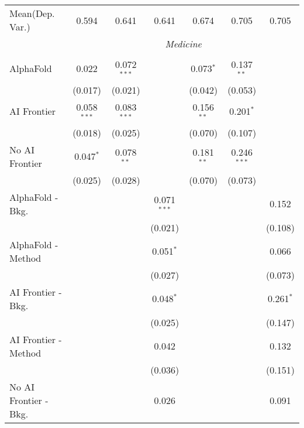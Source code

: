 \begin{tabular}{lcccccc}
Mean(Dep. Var.) & 0.594 & 0.641 & 0.641 & 0.674 & 0.705 & 0.705 \\
 & \multicolumn{6}{c}{\textit{Medicine}} \\ \\
   AlphaFold               & 0.022         & 0.072$^{***}$ &               & 0.073$^{*}$  & 0.137$^{**}$  &   \\   
                           & (0.017)       & (0.021)       &               & (0.042)      & (0.053)       &   \\   
   AI Frontier             & 0.058$^{***}$ & 0.083$^{***}$ &               & 0.156$^{**}$ & 0.201$^{*}$   &   \\   
                           & (0.018)       & (0.025)       &               & (0.070)      & (0.107)       &   \\   
   No AI Frontier          & 0.047$^{*}$   & 0.078$^{**}$  &               & 0.181$^{**}$ & 0.246$^{***}$ &   \\   
                           & (0.025)       & (0.028)       &               & (0.070)      & (0.073)       &   \\   
   AlphaFold - Bkg.        &               &               & 0.071$^{***}$ &              &               & 0.152\\   
                           &               &               & (0.021)       &              &               & (0.108)\\   
   AlphaFold - Method      &               &               & 0.051$^{*}$   &              &               & 0.066\\   
                           &               &               & (0.027)       &              &               & (0.073)\\   
   AI Frontier - Bkg.      &               &               & 0.048$^{*}$   &              &               & 0.261$^{*}$\\   
                           &               &               & (0.025)       &              &               & (0.147)\\   
   AI Frontier - Method    &               &               & 0.042         &              &               & 0.132\\   
                           &               &               & (0.036)       &              &               & (0.151)\\   
   No AI Frontier - Bkg.   &               &               & 0.026         &              &               & 0.091\\   

\end{tabular}
